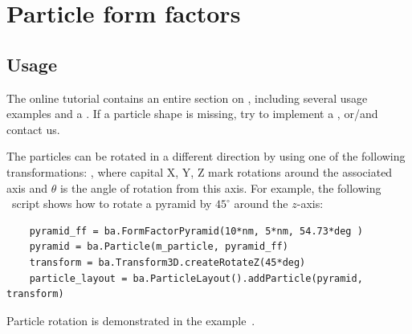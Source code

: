 
\chapter{Particle form factors}\label{SPFF}

\section{Usage}\label{SintroPFF}

%
%
%
The online tutorial contains an entire section on
  , including several usage examples
  and a .
  If a particle shape is missing, try to implement a ,
  or/and contact us.

The particles can be rotated in a different direction by using one of
the following transformations: , where capital X, Y, Z mark rotations
around the associated axis and $\theta$ is the
angle of rotation from this axis. For example, the following \ script shows how to rotate a pyramid by $45^{\circ}$ around
the $z$-axis:\\

\setPy
\begin{lstlisting}
    pyramid_ff = ba.FormFactorPyramid(10*nm, 5*nm, 54.73*deg )
    pyramid = ba.Particle(m_particle, pyramid_ff)
    transform = ba.Transform3D.createRotateZ(45*deg)
    particle_layout = ba.ParticleLayout().addParticle(pyramid, transform)
\end{lstlisting}

Particle rotation is demonstrated in the example~.

